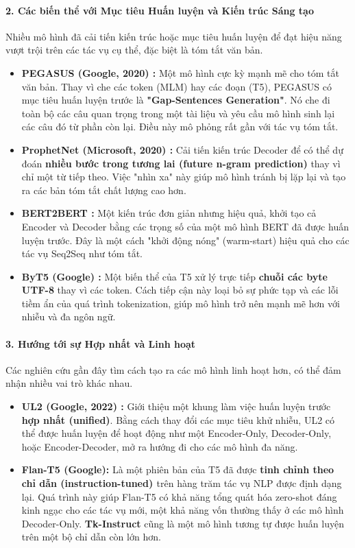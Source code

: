 \paragraph{2. Các biến thể với Mục tiêu Huấn luyện và Kiến trúc Sáng tạo}
Nhiều mô hình đã cải tiến kiến trúc hoặc mục tiêu huấn luyện để đạt hiệu năng vượt trội trên các tác vụ cụ thể, đặc biệt là tóm tắt văn bản.
\begin{itemize}
    \item \textbf{PEGASUS (Google, 2020) \cite{zhang2020pegasus}:} Một mô hình cực kỳ mạnh mẽ cho tóm tắt văn bản. Thay vì che các token (MLM) hay các đoạn (T5), PEGASUS có mục tiêu huấn luyện trước là \textbf{"Gap-Sentences Generation"}. Nó che đi toàn bộ các câu quan trọng trong một tài liệu và yêu cầu mô hình sinh lại các câu đó từ phần còn lại. Điều này mô phỏng rất gần với tác vụ tóm tắt.
    \item \textbf{ProphetNet (Microsoft, 2020) \cite{qi2020prophetnet}:} Cải tiến kiến trúc Decoder để có thể dự đoán \textbf{nhiều bước trong tương lai (future n-gram prediction)} thay vì chỉ một từ tiếp theo. Việc "nhìn xa" này giúp mô hình tránh bị lặp lại và tạo ra các bản tóm tắt chất lượng cao hơn.
    \item \textbf{BERT2BERT \cite{rothe2020leveraging}:} Một kiến trúc đơn giản nhưng hiệu quả, khởi tạo cả Encoder và Decoder bằng các trọng số của một mô hình BERT đã được huấn luyện trước. Đây là một cách "khởi động nóng" (warm-start) hiệu quả cho các tác vụ Seq2Seq như tóm tắt.
    \item \textbf{ByT5 (Google) \cite{xue2022byt5}:} Một biến thể của T5 xử lý trực tiếp \textbf{chuỗi các byte UTF-8} thay vì các token. Cách tiếp cận này loại bỏ sự phức tạp và các lỗi tiềm ẩn của quá trình tokenization, giúp mô hình trở nên mạnh mẽ hơn với nhiễu và đa ngôn ngữ.
\end{itemize}

\paragraph{3. Hướng tới sự Hợp nhất và Linh hoạt}
Các nghiên cứu gần đây tìm cách tạo ra các mô hình linh hoạt hơn, có thể đảm nhận nhiều vai trò khác nhau.
\begin{itemize}
    \item \textbf{UL2 (Google, 2022) \cite{tay2022unifying}:} Giới thiệu một khung làm việc huấn luyện trước \textbf{hợp nhất (unified)}. Bằng cách thay đổi các mục tiêu khử nhiễu, UL2 có thể được huấn luyện để hoạt động như một Encoder-Only, Decoder-Only, hoặc Encoder-Decoder, mở ra hướng đi cho các mô hình đa năng.
    \item \textbf{Flan-T5 (Google):} Là một phiên bản của T5 đã được \textbf{tinh chỉnh theo chỉ dẫn (instruction-tuned) \cite{chung2022scaling}} trên hàng trăm tác vụ NLP được định dạng lại. Quá trình này giúp Flan-T5 có khả năng tổng quát hóa zero-shot đáng kinh ngạc cho các tác vụ mới, một khả năng vốn thường thấy ở các mô hình Decoder-Only. \textbf{Tk-Instruct} cũng là một mô hình tương tự được huấn luyện trên một bộ chỉ dẫn còn lớn hơn.
\end{itemize}

